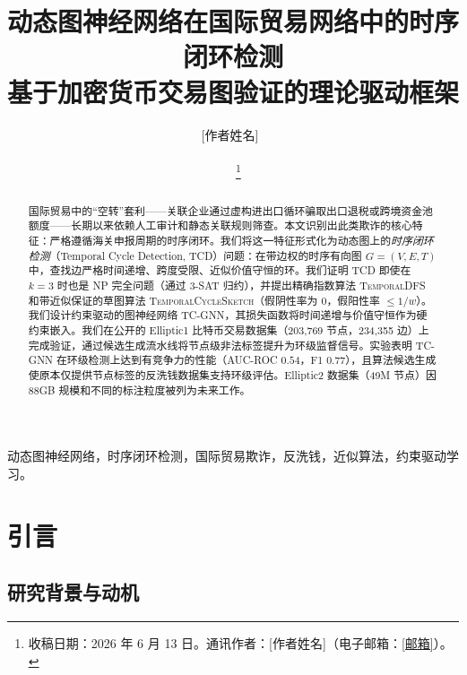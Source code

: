 \documentclass[journal,onecolumn]{IEEEtran}
\begin{document}
\title{动态图神经网络在国际贸易网络中的时序闭环检测\\
       基于加密货币交易图验证的理论驱动框架}

\author{[作者姓名]~\IEEEmembership{[单位],}\\
        [合著者姓名]~\IEEEmembership{[单位],}\\
        [合著者姓名]~\IEEEmembership{[单位]}
\thanks{收稿日期：2026 年 6 月 13 日。通讯作者：[作者姓名]（电子邮箱：\url{[邮箱]}）。}}

\maketitle

\begin{abstract}
国际贸易中的``空转''套利——关联企业通过虚构进出口循环骗取出口退税或跨境资金池额度——长期以来依赖人工审计和静态关联规则筛查。本文识别出此类欺诈的核心特征：严格遵循海关申报周期的时序闭环。我们将这一特征形式化为动态图上的\emph{时序闭环检测}（Temporal Cycle Detection, TCD）问题：在带边权的时序有向图 $G=(V,E,T)$ 中，查找边严格时间递增、跨度受限、近似价值守恒的环。我们证明 TCD 即使在 $k=3$ 时也是 NP 完全问题（通过 3-SAT 归约），并提出精确指数算法 \textsc{TemporalDFS} 和带近似保证的草图算法 \textsc{TemporalCycleSketch}（假阴性率为 0，假阳性率 $\leq 1/w$）。我们设计约束驱动的图神经网络 \textsc{TC-GNN}，其损失函数将时间递增与价值守恒作为硬约束嵌入。我们在公开的 Elliptic1 比特币交易数据集（203{,}769 节点，234{,}355 边）上完成验证，通过候选生成流水线将节点级非法标签提升为环级监督信号。实验表明 TC-GNN 在环级检测上达到有竞争力的性能（AUC-ROC $0.54$，F1 $0.77$），且算法候选生成使原本仅提供节点标签的反洗钱数据集支持环级评估。Elliptic2 数据集（49M 节点）因 $88$GB 规模和不同的标注粒度被列为未来工作。
\end{abstract}

\begin{IEEEkeywords}
动态图神经网络，时序闭环检测，国际贸易欺诈，反洗钱，近似算法，约束驱动学习。
\end{IEEEkeywords}

\section{引言}
\label{sec:intro}

\subsection{研究背景与动机}
\label{sec:intro-bg}
\end{document}
